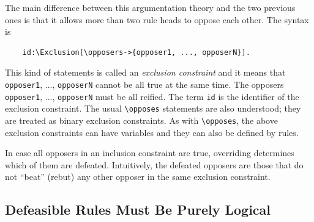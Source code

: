 \documentclass[11pt]{article}
\newcommand{\bs}{\textbackslash}
\begin{document}
The main difference between this argumentation theory and the two previous
ones is that it allows more than two rule heads to oppose each other.
The syntax is
\begin{verbatim}
    id:\Exclusion[\opposers->{opposer1, ..., opposerN}].
\end{verbatim}
This kind of statements is called an \emph{exclusion constraint} and it
means that {\tt opposer1}, ..., {\tt opposerN} cannot be all true    
at the same time. The opposers {\tt opposer1}, ..., {\tt opposerN} must be
all reified. The term {\tt id} is the identifier of the
exclusion constraint.
The usual {\tt \bs{}opposes} statements are also understood; they are
treated as binary exclusion constraints.
As with {\tt \bs{}opposes}, the above exclusion constraints can have variables
and they can also be defined by rules.

In case all opposers in an inclusion constraint are true, overriding
determines which of them are defeated.  Intuitively, the defeated opposers
are those that do not ``beat'' (rebut) any other opposer in the same
exclusion constraint.



\subsection{Defeasible Rules Must Be Purely Logical}
\label{sec-defeasible-logical}
\end{document}
